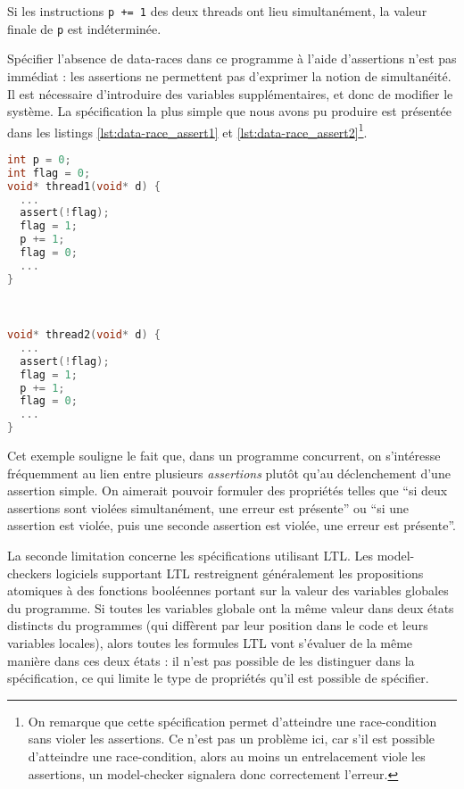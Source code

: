Si les instructions \texttt{p += 1} des deux threads ont lieu simultanément, la
valeur finale de \texttt{p} est indéterminée.

Spécifier l'absence de data-races dans ce programme à l'aide d'assertions n'est
pas immédiat : les assertions ne permettent pas d'exprimer la notion de
simultanéité. Il est nécessaire d'introduire des variables supplémentaires, et
donc de modifier le système. La spécification la plus simple que nous avons pu
produire est présentée dans les listings \ref{lst:data-race_assert1} et
\ref{lst:data-race_assert2}\footnote{On remarque que cette spécification permet
  d'atteindre une race-condition sans violer les assertions. Ce n'est pas un
problème ici, car s’il est possible d'atteindre une race-condition, alors au
moins un entrelacement viole les assertions, un model-checker signalera donc
correctement l'erreur.}.

\noindent\begin{minipage}{.45\textwidth}
  \begin{lstlisting}[language=C, frame=single, caption=Thread 1,
    label=lst:data-race_assert1]
int p = 0;
int flag = 0;
void* thread1(void* d) {
  ...
  assert(!flag);
  flag = 1;
  p += 1;
  flag = 0;
  ...
}
\end{lstlisting}
\end{minipage}\hfill
\begin{minipage}{.45\textwidth}
\begin{lstlisting}[language=C, frame=single, caption=Thread 2,
    label=lst:data-race_assert2]


void* thread2(void* d) {
  ...
  assert(!flag);
  flag = 1;
  p += 1;
  flag = 0;
  ...
}
\end{lstlisting}
\end{minipage}

Cet exemple souligne le fait que, dans un programme concurrent, on
s'intéresse fréquemment au lien entre plusieurs \emph{assertions} plutôt qu'au
déclenchement d'une assertion simple. On aimerait pouvoir formuler des
propriétés telles que ``si deux assertions sont violées simultanément, une
erreur est présente'' ou ``si une assertion est violée, puis une seconde
assertion est violée, une erreur est présente''.

La seconde limitation concerne les spécifications utilisant \ac{LTL}.
Les model-checkers logiciels supportant \ac{LTL} restreignent généralement les
propositions atomiques à des fonctions booléennes portant sur la valeur des
variables globales du programme.
Si toutes les variables globale ont la même valeur dans deux états distincts du
programmes (qui diffèrent par leur position dans le code et leurs variables
locales), alors toutes les formules \ac{LTL} vont s'évaluer de la même manière
dans ces deux états : il n'est pas possible de les distinguer dans la
spécification, ce qui limite le type de propriétés qu'il est possible de spécifier.

